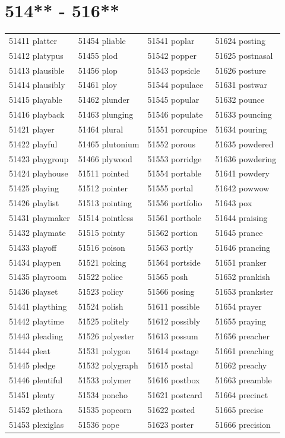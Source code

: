 \documentclass[10pt, oneside]{book}
\begin{document}
\begin{table}
	\centering
	\section*{514** - 516**}
	\begin{tabular}{l l l l}
51411 platter &51454 pliable &51541 poplar &51624 posting\\
51412 platypus &51455 plod &51542 popper &51625 postnasal\\
51413 plausible &51456 plop &51543 popsicle &51626 posture\\
51414 plausibly &51461 ploy &51544 populace &51631 postwar\\
51415 playable &51462 plunder &51545 popular &51632 pounce\\
51416 playback &51463 plunging &51546 populate &51633 pouncing\\
51421 player &51464 plural &51551 porcupine &51634 pouring\\
51422 playful &51465 plutonium &51552 porous &51635 powdered\\
51423 playgroup &51466 plywood &51553 porridge &51636 powdering\\
51424 playhouse &51511 pointed &51554 portable &51641 powdery\\
51425 playing &51512 pointer &51555 portal &51642 powwow\\
51426 playlist &51513 pointing &51556 portfolio &51643 pox\\
51431 playmaker &51514 pointless &51561 porthole &51644 praising\\
51432 playmate &51515 pointy &51562 portion &51645 prance\\
51433 playoff &51516 poison &51563 portly &51646 prancing\\
51434 playpen &51521 poking &51564 portside &51651 pranker\\
51435 playroom &51522 police &51565 posh &51652 prankish\\
51436 playset &51523 policy &51566 posing &51653 prankster\\
51441 plaything &51524 polish &51611 possible &51654 prayer\\
51442 playtime &51525 politely &51612 possibly &51655 praying\\
51443 pleading &51526 polyester &51613 possum &51656 preacher\\
51444 pleat &51531 polygon &51614 postage &51661 preaching\\
51445 pledge &51532 polygraph &51615 postal &51662 preachy\\
51446 plentiful &51533 polymer &51616 postbox &51663 preamble\\
51451 plenty &51534 poncho &51621 postcard &51664 precinct\\
51452 plethora &51535 popcorn &51622 posted &51665 precise\\
51453 plexiglas &51536 pope &51623 poster &51666 precision\\
	\end{tabular}
 \end{table}
\clearpage
\end{document}
